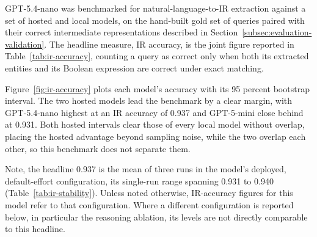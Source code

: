 GPT-5.4-nano was benchmarked for natural-language-to-IR extraction against a set of hosted and local models, on the hand-built gold set of queries paired with their correct intermediate representations described in Section~\ref{subsec:evaluation-validation}. The headline measure, IR accuracy, is the joint figure reported in Table~\ref{tab:ir-accuracy}, counting a query as correct only when both its extracted entities and its Boolean expression are correct under exact matching.

Figure~\ref{fig:ir-accuracy} plots each model's accuracy with its 95 percent bootstrap interval. The two hosted models lead the benchmark by a clear margin, with GPT-5.4-nano highest at an IR accuracy of 0.937 and GPT-5-mini close behind at 0.931. Both hosted intervals clear those of every local model without overlap, placing the hosted advantage beyond sampling noise, while the two overlap each other, so this benchmark does not separate them.

Note, the headline 0.937 is the mean of three runs in the model's deployed, default-effort configuration, its single-run range spanning 0.931 to 0.940 (Table~\ref{tab:ir-stability}). Unless noted otherwise, IR-accuracy figures for this model refer to that configuration. Where a different configuration is reported below, in particular the reasoning ablation, its levels are not directly comparable to this headline.

